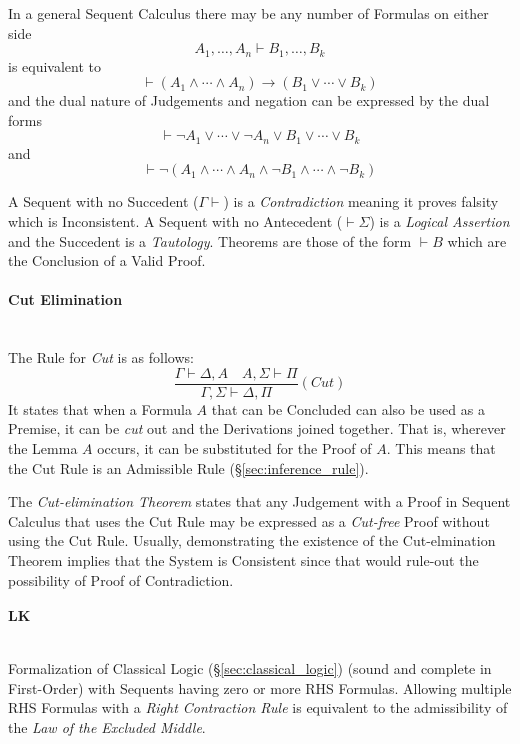 In a general Sequent Calculus there may be any number of Formulas on
either side
\[
    A_1, \ldots, A_n \vdash B_1, \ldots, B_k
\]
is equivalent to
\[
    \vdash(A_1 \wedge \cdots \wedge A_n) \rightarrow (B_1 \vee \cdots \vee B_k)
\]
and the dual nature of Judgements and negation can be expressed by the
dual forms
\[
    \vdash \neg A_1 \vee \cdots \vee \neg A_n \vee B_1 \vee \cdots
    \vee B_k
\]
and
\[
    \vdash \neg(A_1 \wedge \cdots \wedge A_n \wedge \neg B_1 \wedge
    \cdots \wedge \neg B_k)
\]

A Sequent with no Succedent ($\Gamma \vdash$) is a
\emph{Contradiction} meaning it proves falsity which is
Inconsistent. A Sequent with no Antecedent ($\vdash \Sigma$) is a
\emph{Logical Assertion} and the Succedent is a
\emph{Tautology}. Theorems are those of the form $\vdash B$ which are
the Conclusion of a Valid Proof.



\paragraph{Cut Elimination}\label{sec:cut_elimination} \hfill \\

The Rule for \emph{Cut} is as follows:
\[
    \frac{
        \Gamma \vdash \Delta, A \quad A, \Sigma \vdash \Pi
    }{
        \Gamma, \Sigma \vdash \Delta, \Pi
    }(Cut)
\]
It states that when a Formula $A$ that can be Concluded can also be
used as a Premise, it can be \emph{cut} out and the Derivations joined
together. That is, wherever the Lemma $A$ occurs, it can be
substituted for the Proof of $A$. This means that the Cut Rule is an
Admissible Rule (\S\ref{sec:inference_rule}).

The \emph{Cut-elimination Theorem} states that any Judgement with a
Proof in Sequent Calculus that uses the Cut Rule may be expressed as a
\emph{Cut-free} Proof without using the Cut Rule. Usually,
demonstrating the existence of the Cut-elmination Theorem implies that
the System is Consistent since that would rule-out the possibility of
Proof of Contradiction.



\paragraph{$\mathbf{LK}$}\label{sec:lk} \hfill \\

Formalization of Classical Logic (\S\ref{sec:classical_logic})
(sound and complete in First-Order) with Sequents having zero or more
RHS Formulas. Allowing multiple RHS Formulas with a \emph{Right
  Contraction Rule} is equivalent to the admissibility of the
\emph{Law of the Excluded Middle}.



